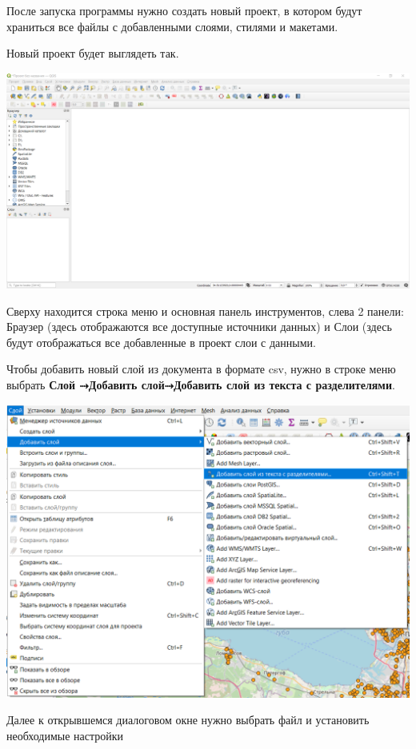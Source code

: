 \documentclass[
]{book}
\begin{document}
После запуска программы нужно создать новый проект, в котором будут храниться все файлы с добавленными слоями, стилями и макетами.

Новый проект будет выглядеть так.

\includegraphics{figures/1.PNG}

Сверху находится строка меню и основная панель инструментов, слева 2 панели: Браузер (здесь отображаются все доступные источники данных) и Слои (здесь будут отображаться все добавленные в проект слои с данными.

Чтобы добавить новый слой из документа в формате csv, нужно в строке меню выбрать \textbf{Слой ⤑Добавить слой⤑Добавить слой из текста с разделителями}.

\includegraphics{figures/2.png}

Далее к открывшемся диалоговом окне нужно выбрать файл и установить необходимые настройки
\end{document}
